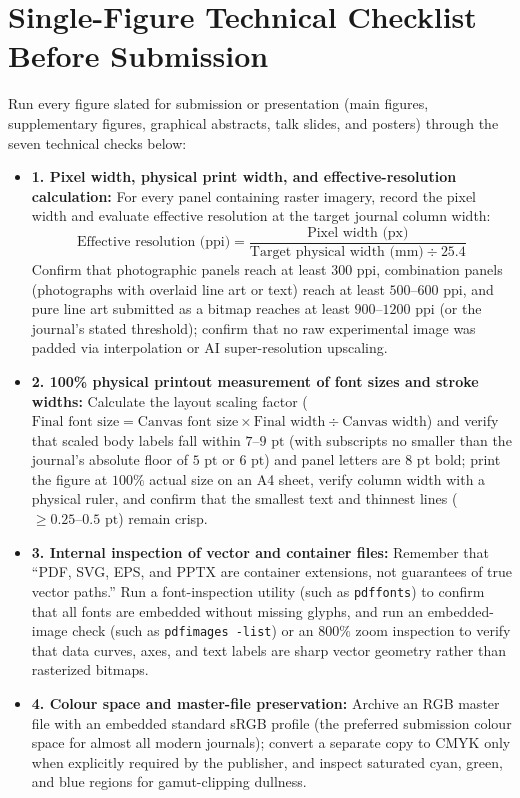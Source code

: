 \section{Single-Figure Technical Checklist Before Submission}

Run every figure slated for submission or presentation (main figures, supplementary figures, graphical abstracts, talk slides, and posters) through the seven technical checks below:

\begin{itemize}
  \item[$\square$] \textbf{1. Pixel width, physical print width, and effective-resolution calculation:} For every panel containing raster imagery, record the pixel width and evaluate effective resolution at the target journal column width:
  \[
    \text{Effective resolution (ppi)} = \frac{\text{Pixel width (px)}}{\text{Target physical width (mm)} \div 25.4}
  \]
  Confirm that photographic panels reach at least $300\text{ ppi}$, combination panels (photographs with overlaid line art or text) reach at least $500\text{--}600\text{ ppi}$, and pure line art submitted as a bitmap reaches at least $900\text{--}1200\text{ ppi}$ (or the journal's stated threshold); confirm that no raw experimental image was padded via interpolation or AI super-resolution upscaling.
  \item[$\square$] \textbf{2. 100\% physical printout measurement of font sizes and stroke widths:} Calculate the layout scaling factor ($\text{Final font size} = \text{Canvas font size} \times \text{Final width} \div \text{Canvas width}$) and verify that scaled body labels fall within $7\text{--}9\text{ pt}$ (with subscripts no smaller than the journal's absolute floor of $5\text{ pt}$ or $6\text{ pt}$) and panel letters are $8\text{ pt}$ bold; print the figure at $100\%$ actual size on an A4 sheet, verify column width with a physical ruler, and confirm that the smallest text and thinnest lines ($\ge 0.25\text{--}0.5\text{ pt}$) remain crisp.
  \item[$\square$] \textbf{3. Internal inspection of vector and container files:} Remember that ``PDF, SVG, EPS, and PPTX are container extensions, not guarantees of true vector paths.'' Run a font-inspection utility (such as \texttt{pdffonts}) to confirm that all fonts are embedded without missing glyphs, and run an embedded-image check (such as \texttt{pdfimages -list}) or an $800\%$ zoom inspection to verify that data curves, axes, and text labels are sharp vector geometry rather than rasterized bitmaps.
  \item[$\square$] \textbf{4. Colour space and master-file preservation:} Archive an RGB master file with an embedded standard sRGB profile (the preferred submission colour space for almost all modern journals); convert a separate copy to CMYK only when explicitly required by the publisher, and inspect saturated cyan, green, and blue regions for gamut-clipping dullness.

\end{itemize}
